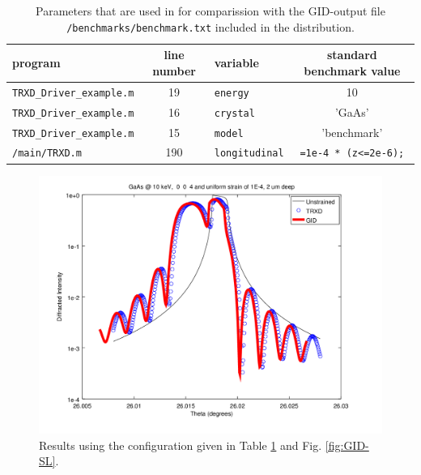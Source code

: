 \documentclass[letterpaper,11pt]{article}
\begin{document}
\begin{table}
\begin{centering}
\begin{tabular}{l |c | l | c}
program & line number  & variable & standard benchmark value \\
\hline
\texttt{TRXD\_Driver\_example.m} & 19 & \texttt{energy} & 10 \\
\texttt{TRXD\_Driver\_example.m} & 16 & \texttt{crystal} & 'GaAs' \\
\texttt{TRXD\_Driver\_example.m} & 15 & \texttt{model} & 'benchmark' \\
\texttt{/main/TRXD.m} & 190 & \texttt{longitudinal} & \texttt{=1e-4 * (z<=2e-6);} \\
\end{tabular} 
\caption{Parameters that are used in for comparission with the GID-output file \texttt{/benchmarks/benchmark.txt} included in the distribution.}
\label{table:benchmark}
\end{centering}
\end{table}

\begin{figure}
\begin{centering}
\includegraphics[scale = 0.65]{Log_benchmark.png}
\caption{Results using the configuration given in Table \ref{table:benchmark} and Fig. \ref{fig:GID-SL}.}
\end{centering}
\end{figure}
\end{document}
